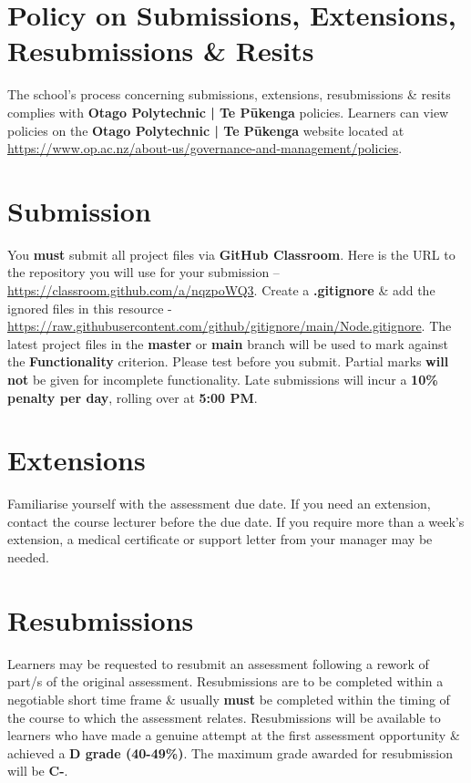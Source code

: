 \documentclass{article}
\begin{document}
\section*{Policy on Submissions, Extensions, Resubmissions \& Resits}
The school's process concerning submissions, extensions, resubmissions \& resits complies with \textbf{Otago Polytechnic | Te Pūkenga} policies. Learners can view policies on the \textbf{Otago Polytechnic | Te Pūkenga} website located at \href{https://www.op.ac.nz/about-us/governance-and-management/policies}{https://www.op.ac.nz/about-us/governance-and-management/policies}. 

\section*{Submission}
You \textbf{must} submit all project files via \textbf{GitHub Classroom}. Here is the URL to the repository you will use for your submission – \href{https://classroom.github.com/a/nqzpoWQ3}{https://classroom.github.com/a/nqzpoWQ3}.  Create a \textbf{.gitignore} \& add the ignored files in this resource - \href{https://raw.githubusercontent.com/github/gitignore/main/Node.gitignore}{https://raw.githubusercontent.com/github/gitignore/main/Node.gitignore}. The latest project files in the \textbf{master} or \textbf{main} branch will be used to mark against the \textbf{Functionality} criterion. Please test before you submit. Partial marks \textbf{will not} be given for incomplete functionality. Late submissions will incur a \textbf{10\% penalty per day}, rolling over at \textbf{5:00 PM}.

\section*{Extensions}
Familiarise yourself with the assessment due date. If you need an extension, contact the course lecturer before the due date. If you require more than a week's extension, a medical certificate or support letter from your manager may be needed.

\section*{Resubmissions}
Learners may be requested to resubmit an assessment following a rework of part/s of the original assessment. Resubmissions are to be completed within a negotiable short time frame \& usually \textbf{must} be completed within the timing of the course to which the assessment relates. Resubmissions will be available to learners who have made a genuine attempt at the first assessment opportunity \& achieved a \textbf{D grade (40-49\%)}. The maximum grade awarded for resubmission will be \textbf{C-}.
\end{document}
